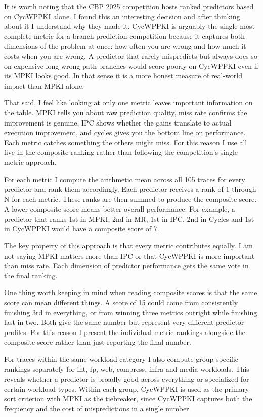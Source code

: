 \documentclass[11pt,a4paper]{article}
\begin{document}
It is worth noting that the CBP 2025 competition hosts ranked predictors based 
on CycWPPKI alone. I found this an interesting decision and after thinking about 
it I understand why they made it. CycWPPKI is arguably the single most complete 
metric for a branch prediction competition because it captures both dimensions 
of the problem at once: how often you are wrong and how much it costs when you 
are wrong. A predictor that rarely mispredicts but always does so on expensive 
long wrong-path branches would score poorly on CycWPPKI even if its MPKI looks 
good. In that sense it is a more honest measure of real-world impact than MPKI 
alone.

That said, I feel like looking at only one metric leaves important information 
on the table. MPKI tells you about raw prediction quality, miss rate confirms 
the improvement is genuine, IPC shows whether the gains translate to actual 
execution improvement, and cycles gives you the bottom line on performance. 
Each metric catches something the others might miss. For this reason I use all 
five in the composite ranking rather than following the competition's single 
metric approach.

For each metric I compute the arithmetic mean across all 105 traces for every 
predictor and rank them accordingly. Each predictor receives a rank of 1 through 
N for each metric. These ranks are then summed to produce the composite score. 
A lower composite score means better overall performance. For example, a 
predictor that ranks 1st in MPKI, 2nd in MR, 1st in IPC, 2nd in Cycles and 
1st in CycWPPKI would have a composite score of 7.

The key property of this approach is that every metric contributes equally. 
I am not saying MPKI matters more than IPC or that CycWPPKI is more important 
than miss rate. Each dimension of predictor performance gets the same vote in 
the final ranking.

One thing worth keeping in mind when reading composite scores is that the same 
score can mean different things. A score of 15 could come from consistently 
finishing 3rd in everything, or from winning three metrics outright while 
finishing last in two. Both give the same number but represent very different 
predictor profiles. For this reason I present the individual metric rankings 
alongside the composite score rather than just reporting the final number.

For traces within the same workload category I also compute group-specific 
rankings separately for int, fp, web, compress, infra and media workloads. 
This reveals whether a predictor is broadly good across everything or 
specialized for certain workload types. Within each group, CycWPPKI is used 
as the primary sort criterion with MPKI as the tiebreaker, since CycWPPKI 
captures both the frequency and the cost of mispredictions in a single number.
\end{document}

